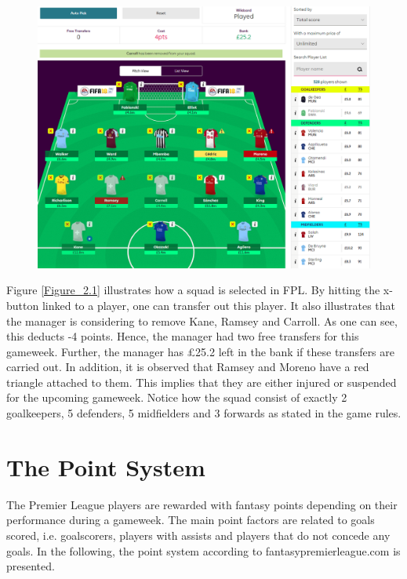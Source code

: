 \begin{figure}[H]
\centering
\includegraphics[scale=0.35]{fig/fantasyteam1.png}
\label{Figure_2.1}
\label{fig:fantasy_bilde}
\end{figure}

Figure \ref{Figure_2.1} illustrates how a squad is selected in FPL. By hitting the x-button linked to a player, one can transfer out this player. It also illustrates that the manager is considering to remove Kane, Ramsey and Carroll. As one can see, this deducts -4 points. Hence, the manager had two free transfers for this gameweek. Further, the manager has \pounds 25.2 left in the bank if these transfers are carried out. In addition, it is observed that Ramsey and Moreno have a red triangle attached to them. This implies that they are either injured or suspended for the upcoming gameweek. Notice how the squad consist of exactly 2 goalkeepers, 5 defenders, 5 midfielders and 3 forwards as stated in the game rules. 


\section{The Point System} \label{point_system}
The Premier League players are rewarded with fantasy points depending on their performance during a gameweek. The main point factors are related to goals scored, i.e. goalscorers, players with assists and players that do not concede any goals. In the following, the point system according to fantasypremierleague.com is presented. 


